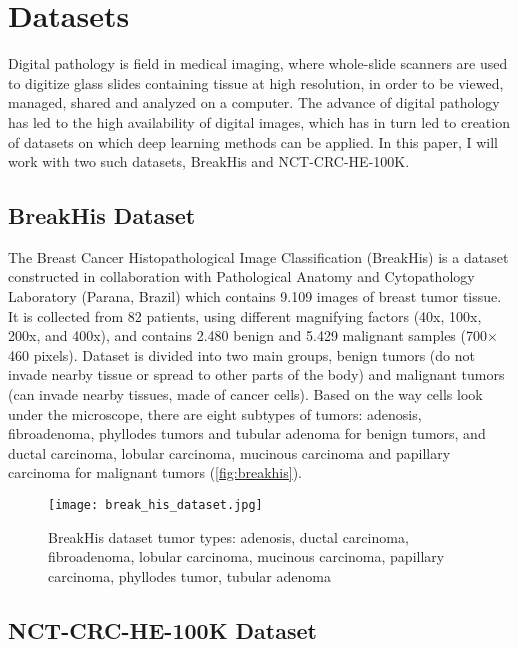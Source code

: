 \section{Datasets}
Digital pathology is field in medical imaging, where whole-slide scanners are used to digitize glass slides containing tissue at high resolution, in order to be viewed, managed, shared and analyzed on a computer. The advance of digital pathology has led to the high availability of digital images, which has in turn led to creation of datasets on which deep learning methods can be applied. In this paper, I will work with two such datasets, BreakHis and NCT-CRC-HE-100K.

\subsection{BreakHis Dataset}

The Breast Cancer Histopathological Image Classification \cite{breakhis_article} (BreakHis) is a dataset constructed in collaboration with Pathological Anatomy and Cytopathology Laboratory (Parana, Brazil) which contains 9.109 images of breast tumor tissue. It is collected from 82 patients, using different magnifying factors (40x, 100x, 200x, and 400x), and contains 2.480  benign and 5.429 malignant samples (700$\times$460 pixels). Dataset is divided into two main groups, benign tumors (do not invade nearby tissue or spread to other parts of the body) and malignant tumors (can invade nearby tissues, made of cancer cells). Based on the way cells look under the microscope, there are eight subtypes of tumors: adenosis, fibroadenoma, phyllodes tumors and tubular adenoma for benign tumors, and ductal carcinoma, lobular carcinoma, mucinous carcinoma and papillary carcinoma for malignant tumors (\textcolor{red}{\autoref{fig:breakhis}}).

\captionsetup[figure]{font=scriptsize,labelfont=scriptsize}

\begin{figure}[h]
	\centering
	\texttt{[image: break\_his\_dataset.jpg]}
	\caption{BreakHis dataset tumor types: adenosis, ductal carcinoma, fibroadenoma, lobular carcinoma, mucinous carcinoma, papillary carcinoma, phyllodes tumor, tubular adenoma}
	\label{fig:breakhis}
\end{figure}

\subsection{NCT-CRC-HE-100K Dataset}


